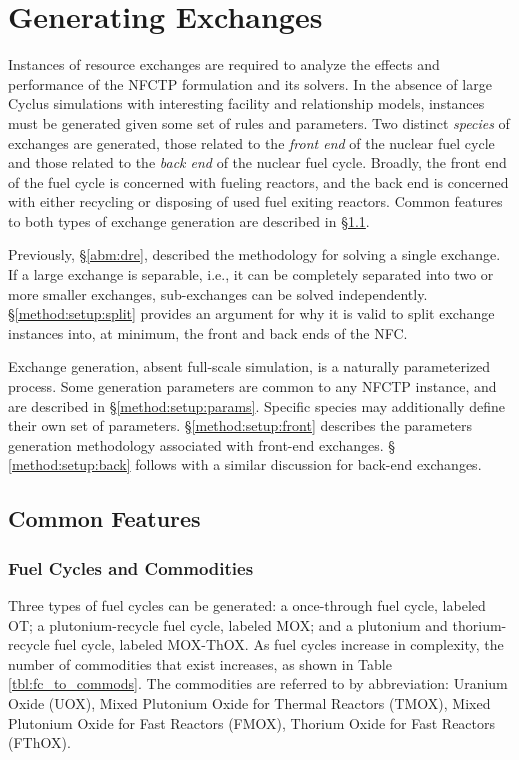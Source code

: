 
\section{Generating Exchanges}\label{method:setup}

Instances of resource exchanges are required to analyze the effects and
performance of the NFCTP formulation and its solvers. In the absence of large
Cyclus simulations with interesting facility and relationship models, instances
must be generated given some set of rules and parameters. Two distinct
\textit{species} of exchanges are generated, those related to the \textit{front
  end} of the nuclear fuel cycle and those related to the \textit{back end} of
the nuclear fuel cycle. Broadly, the front end of the fuel cycle is concerned
with fueling reactors, and the back end is concerned with either recycling or
disposing of used fuel exiting reactors. Common features to both types of
exchange generation are described in \S \ref{method:setup:features}.

Previously, \S \ref{abm:dre}, described the methodology for solving a single
exchange. If a large exchange is separable, i.e., it can be completely separated
into two or more smaller exchanges, sub-exchanges can be solved
independently. \S \ref{method:setup:split} provides an argument for why it is
valid to split exchange instances into, at minimum, the front and back ends of
the NFC.

Exchange generation, absent full-scale simulation, is a naturally parameterized
process. Some generation parameters are common to any NFCTP instance, and are
described in \S \ref{method:setup:params}. Specific species may additionally
define their own set of parameters. \S \ref{method:setup:front} describes the
parameters generation methodology associated with front-end exchanges. \S
\ref{method:setup:back} follows with a similar discussion for back-end
exchanges.

\subsection{Common Features}\label{method:setup:features}

\subsubsection{Fuel Cycles and Commodities}

Three types of fuel cycles can be generated: a once-through fuel cycle, labeled
OT; a plutonium-recycle fuel cycle, labeled MOX; and a plutonium and
thorium-recycle fuel cycle, labeled MOX-ThOX. As fuel cycles increase in
complexity, the number of commodities that exist increases, as shown in Table
\ref{tbl:fc_to_commods}. The commodities are referred to by abbreviation:
Uranium Oxide (UOX), Mixed Plutonium Oxide for Thermal Reactors (TMOX), Mixed
Plutonium Oxide for Fast Reactors (FMOX), Thorium Oxide for Fast Reactors
(FThOX).

